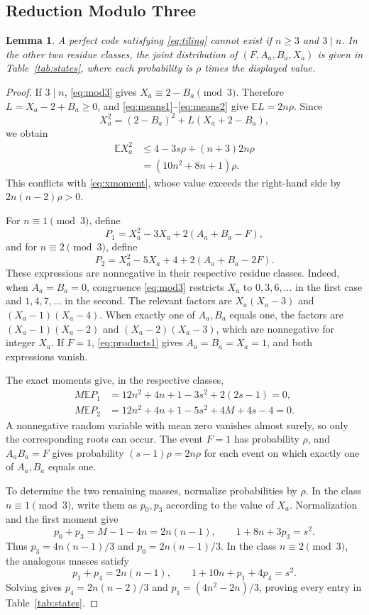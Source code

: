 \documentclass[12pt,letterpaper,onecolumn]{article}
\newtheorem{lemma}[theorem]{Lemma}
\theoremstyle{definition}
\newcommand{\E}{\mathbb{E}}
\begin{document}
\subsection{Reduction Modulo Three}
\begin{lemma}\label{lem:mod3}
A perfect code satisfying \eqref{eq:tiling} cannot exist if $n\ge3$ and $3\mid n$. In the other two residue classes, the joint distribution of $(F,A_a,B_a,X_a)$ is given in Table~\ref{tab:states}, where each probability is $\rho$ times the displayed value.
\end{lemma}
\begin{proof}
If $3\mid n$, \eqref{eq:mod3} gives $X_a\equiv2-B_a\pmod3$. Therefore $L=X_a-2+B_a\ge0$, and \eqref{eq:means1}--\eqref{eq:means2} give $\E L=2n\rho$. Since
\[
 X_a^2=(2-B_a)^2+L(X_a+2-B_a),
\]
we obtain
\begin{align}\label{eq:mod3-upper}
 \E X_a^2
 &\le4-3s\rho+(n+3)2n\rho\nonumber\\
 &=(10n^2+8n+1)\rho.
\end{align}
This conflicts with \eqref{eq:xmoment}, whose value exceeds the right-hand side by $2n(n-2)\rho>0$.

For $n\equiv1\pmod3$, define
\[
 P_1=X_a^2-3X_a+2(A_a+B_a-F),
\]
and for $n\equiv2\pmod3$, define
\[
 P_2=X_a^2-5X_a+4+2(A_a+B_a-2F).
\]
These expressions are nonnegative in their respective residue classes. Indeed, when $A_a=B_a=0$, congruence \eqref{eq:mod3} restricts $X_a$ to $0,3,6,\ldots$ in the first case and $1,4,7,\ldots$ in the second. The relevant factors are $X_a(X_a-3)$ and $(X_a-1)(X_a-4)$. When exactly one of $A_a,B_a$ equals one, the factors are $(X_a-1)(X_a-2)$ and $(X_a-2)(X_a-3)$, which are nonnegative for integer $X_a$. If $F=1$, \eqref{eq:products1} gives $A_a=B_a=X_a=1$, and both expressions vanish.

The exact moments give, in the respective classes,
\begin{align*}
 M\E P_1&=12n^2+4n+1-3s^2+2(2s-1)=0,\\
 M\E P_2&=12n^2+4n+1-5s^2+4M+4s-4=0.
\end{align*}
A nonnegative random variable with mean zero vanishes almost surely, so only the corresponding roots can occur. The event $F=1$ has probability $\rho$, and $A_aB_a=F$ gives probability $(s-1)\rho=2n\rho$ for each event on which exactly one of $A_a,B_a$ equals one.

To determine the two remaining masses, normalize probabilities by $\rho$. In the class $n\equiv1\pmod3$, write them as $p_0,p_3$ according to the value of $X_a$. Normalization and the first moment give
\[
 p_0+p_3=M-1-4n=2n(n-1),\qquad
 1+8n+3p_3=s^2.
\]
Thus $p_3=4n(n-1)/3$ and $p_0=2n(n-1)/3$. In the class $n\equiv2\pmod3$, the analogous masses satisfy
\[
 p_1+p_4=2n(n-1),\qquad
 1+10n+p_1+4p_4=s^2.
\]
Solving gives $p_4=2n(n-2)/3$ and $p_1=(4n^2-2n)/3$, proving every entry in Table~\ref{tab:states}.
\end{proof}
\end{document}
